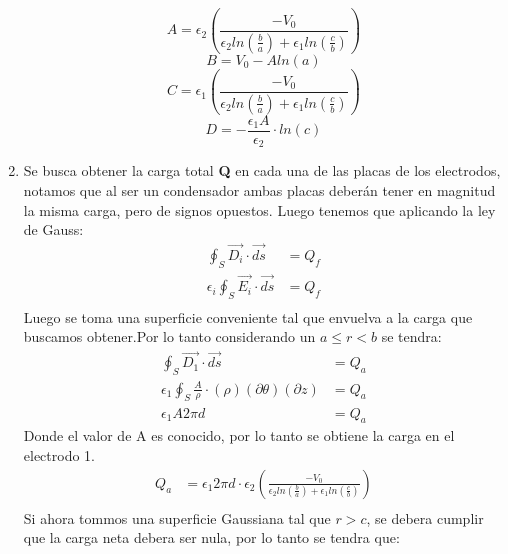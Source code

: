 \documentclass[
  11pt,
  letterpaper,
   addpoints,
   answers
  ]{exam}
\begin{document}
\begin{questions}
\begin{solution}
\begin{enumerate}
            \begin{equation}
            A= \epsilon_{2}\left(\frac{-V_{0} }{\epsilon_{2}ln(\frac{b}{a}) + \epsilon_{1}ln(\frac{c}{b})}\right)
            \end{equation}
            \begin{equation}
            B = V_{0} - Aln(a)
            \end{equation}
            \begin{equation}
            C = \epsilon_{1}\left(\frac{-V_{0}}{\epsilon_{2}ln(\frac{b}{a}) + \epsilon_{1}ln(\frac{c}{b})}\right)
            \end{equation}
            \begin{equation}
            D=-\frac{\epsilon_{1}A}{\epsilon_{2}}\cdot ln(c)
            \end{equation}
        \item Se busca obtener la carga total \textbf{Q} en cada una de las placas de los electrodos, notamos que al ser un condensador ambas placas deberán tener en magnitud la misma carga, pero de signos opuestos. Luego tenemos que aplicando la ley de Gauss:
        \begin{align}
            \oint_{S} \vec{D_{i}} \cdot \vec{ds} &= Q_f\\
        \epsilon_{i} \oint_{S} \vec{E_{i}} \cdot \vec{ds} &= Q_f\\
        \end{align}
        Luego se toma una superficie conveniente tal que envuelva a la carga que buscamos obtener.Por lo tanto considerando un $a \leq r <b$ se tendra:
        \begin{align}
            \oint_{S} \vec{D_{1}} \cdot \vec{ds} &= Q_{a}\\  
            \epsilon_{1} \oint_{S} \frac{A}{\rho} \cdot (\rho) (\partial \theta) (\partial z) &= Q_{a}\\
            \epsilon_{1} A 2 \pi d &= Q_{a}
        \end{align}
        Donde el valor de A es conocido, por lo tanto se obtiene la carga en el electrodo 1.
        \begin{align}
            Q_{a} &= \epsilon_{1}  2 \pi d \cdot \epsilon_{2}\left(\frac{-V_{0} }{\epsilon_{2}ln(\frac{b}{a}) + \epsilon_{1}ln(\frac{c}{b})}\right)\\
        \end{align}
        Si ahora tommos una superficie Gaussiana tal que $ r > c$, se debera cumplir que la carga neta debera ser nula, por lo tanto se tendra que:

\end{enumerate}
\end{solution}
\end{questions}
\end{document}
